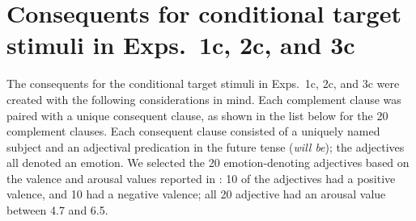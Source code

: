 \documentclass[11pt,fleqn]{article}
\newcommand{\6}{\mbox{$[\hspace*{-.6mm}[$}}
\newcommand{\9}{\mbox{$]\hspace*{-.6mm}]$}}
\begin{document}
\section{Consequents for conditional target stimuli in Exps.~1c, 2c, and 3c}\label{a-target}

The consequents for the conditional target stimuli in Exps.~1c, 2c, and 3c were created with the following considerations in mind. Each complement clause was paired with a unique consequent clause, as shown in the list below for the 20 complement clauses. Each consequent clause consisted of a uniquely named subject and an adjectival predication in the future tense ({\em will be}); the adjectives all denoted an emotion. We selected the 20 emotion-denoting adjectives based on the valence and arousal values reported in \citealt{warriner-etal2013}: 10 of the adjectives had a positive valence, and 10 had a negative valence; all 20 adjective had an arousal value between 4.7 and 6.5. 
\end{document}
